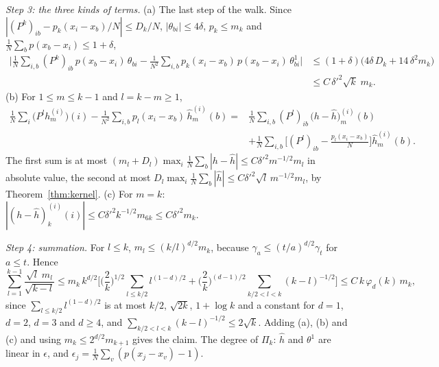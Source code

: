 \documentclass[11pt,a4paper]{article}
\makeatletter
\theoremstyle{stmt}
\theoremstyle{defn}
\theoremstyle{rmk}
\renewenvironment{proof}[1][\proofname]{\par\pushQED{\qed}\normalfont\topsep6\p@\@plus6\p@\relax
  \trivlist\item[\hskip\labelsep{\sffamily\itshape\small #1.}]\ignorespaces}{\popQED\endtrivlist\@endpefalse}
\numberwithin{equation}{section}
\makeatother
\begin{document}
{\begin{proof}
\emph{Step 3: the three kinds of terms.} (a) The last step of the walk. Since $|(P^k)_{ib}-p_k(x_i-x_b)/N|\le D_k/N$, $|\theta_{bi}|\le4\delta$, $p_k\le m_k$ and $\frac1N\sum_bp(x_b-x_i)\le1+\delta$,
\[
\begin{aligned}
\Big|\frac1N\sum_{i,b}(P^k)_{ib}\,p(x_b-x_i)\,\theta_{bi}-\frac1{N^2}\sum_{i,b}p_k(x_i-x_b)\,p(x_b-x_i)\,\theta^1_{bi}\Big|&\le(1+\delta)\big(4\delta\,D_k+14\,\delta^2m_k\big)\\
&\le C\,\delta'^2\sqrt k\;m_k .
\end{aligned}
\]
(b) For $1\le m\le k-1$ and $l=k-m\ge1$,
\[
\begin{aligned}
\frac1N\sum_i\big(P^lh^{(i)}_m\big)(i)-\frac1{N^2}\sum_{i,b}p_l(x_i-x_b)\,\hat h^{(i)}_m(b)
={}&\frac1N\sum_{i,b}(P^l)_{ib}\,\big(h-\hat h\big)^{(i)}_m(b)\\
&+\frac1N\sum_{i,b}\Big[(P^l)_{ib}-\frac{p_l(x_i-x_b)}N\Big]\hat h^{(i)}_m(b).
\end{aligned}
\]
The first sum is at most $(m_l+D_l)\max_i\frac1N\sum_b|h-\hat h|\le C\delta'^2m^{-1/2}m_l$ in absolute value, the second at most $D_l\max_i\frac1N\sum_b|\hat h|\le C\delta'^2\sqrt l\,m^{-1/2}m_l$, by Theorem~\ref{thm:kernel}. (c) For $m=k$: $|(h-\hat h)^{(i)}_k(i)|\le C\delta'^2k^{-1/2}m_{6k}\le C\delta'^2m_k$.

\emph{Step 4: summation.} For $l\le k$, $m_l\le(k/l)^{d/2}m_k$, because $\gamma_a\le(t/a)^{d/2}\gamma_t$ for $a\le t$. Hence
\[
\sum_{l=1}^{k-1}\frac{\sqrt l\;m_l}{\sqrt{k-l}}\le m_k\,k^{d/2}\Big[\Big(\frac2k\Big)^{1/2}\sum_{l\le k/2}l^{(1-d)/2}+\Big(\frac2k\Big)^{(d-1)/2}\sum_{k/2<l<k}(k-l)^{-1/2}\Big]\le C\,k\,\varphi_d(k)\,m_k,
\]
since $\sum_{l\le k/2}l^{(1-d)/2}$ is at most $k/2$, $\sqrt{2k}$, $1+\log k$ and a constant for $d=1$, $d=2$, $d=3$ and $d\ge4$, and $\sum_{k/2<l<k}(k-l)^{-1/2}\le2\sqrt k$. Adding (a), (b) and (c) and using $m_k\le2^{d/2}m_{k+1}$ gives the claim. The degree of $\Pi_k$: $\hat h$ and $\theta^1$ are linear in $\epsilon$, and $\epsilon_j=\frac1N\sum_v(p(x_j-x_v)-1)$.
\end{proof}

}
\end{document}
